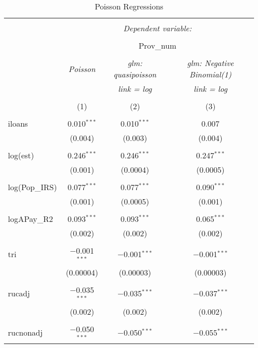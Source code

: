 
\begin{table}[!htbp] \centering 
  \caption{Poisson Regressions} 
  \label{} 
\begin{tabular}{@{\extracolsep{5pt}}lccc} 
\\[-1.8ex]\hline 
\hline \\[-1.8ex] 
 & \multicolumn{3}{c}{\textit{Dependent variable:}} \\ 
\cline{2-4} 
\\[-1.8ex] & \multicolumn{3}{c}{Prov\_num} \\ 
\\[-1.8ex] & \textit{Poisson} & \textit{glm: quasipoisson} & \textit{glm: Negative Binomial(1)} \\ 
 & \textit{} & \textit{link = log} & \textit{link = log} \\ 
\\[-1.8ex] & (1) & (2) & (3)\\ 
\hline \\[-1.8ex] 
 iloans & 0.010$^{***}$ & 0.010$^{***}$ & 0.007 \\ 
  & (0.004) & (0.003) & (0.004) \\ 
  & & & \\ 
 log(est) & 0.246$^{***}$ & 0.246$^{***}$ & 0.247$^{***}$ \\ 
  & (0.001) & (0.0004) & (0.0005) \\ 
  & & & \\ 
 log(Pop\_IRS) & 0.077$^{***}$ & 0.077$^{***}$ & 0.090$^{***}$ \\ 
  & (0.001) & (0.0005) & (0.001) \\ 
  & & & \\ 
 logAPay\_R2 & 0.093$^{***}$ & 0.093$^{***}$ & 0.065$^{***}$ \\ 
  & (0.002) & (0.002) & (0.002) \\ 
  & & & \\ 
 tri & $-$0.001$^{***}$ & $-$0.001$^{***}$ & $-$0.001$^{***}$ \\ 
  & (0.00004) & (0.00003) & (0.00003) \\ 
  & & & \\ 
 rucadj & $-$0.035$^{***}$ & $-$0.035$^{***}$ & $-$0.037$^{***}$ \\ 
  & (0.002) & (0.002) & (0.002) \\ 
  & & & \\ 
 rucnonadj & $-$0.050$^{***}$ & $-$0.050$^{***}$ & $-$0.055$^{***}$ \\ 

\end{tabular}
\end{table}
